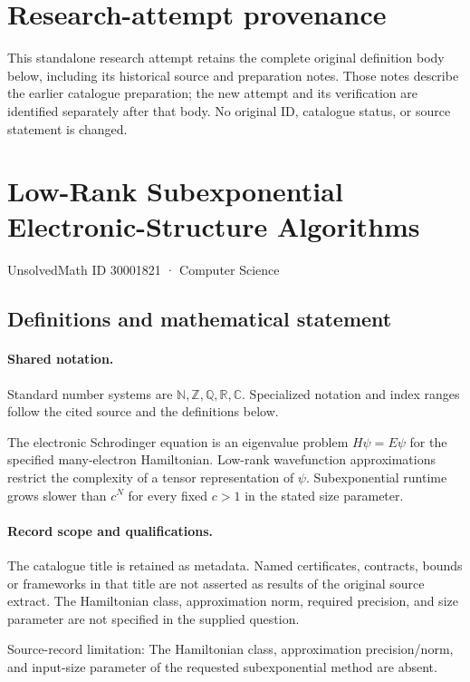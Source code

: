 \documentclass[11pt]{article}
\begin{document}
\section*{Research-attempt provenance}
This standalone research attempt retains the complete original definition body below,
including its historical source and preparation notes. Those notes describe the
earlier catalogue preparation; the new attempt and its verification are identified
separately after that body. No original ID, catalogue status, or source statement is changed.

\section{Low-Rank Subexponential Electronic-Structure Algorithms}\label{30001821}
{\small UnsolvedMath ID 30001821 · Computer Science}
\subsection{Definitions and mathematical statement}

\paragraph{Shared notation.}Standard number systems are $\mathbb N,\mathbb Z,\mathbb Q,\mathbb R,\mathbb C$. Specialized notation and index ranges follow the cited source and the definitions below.


The electronic Schrodinger equation is an eigenvalue problem $H\psi=E\psi$ for the specified many-electron Hamiltonian. Low-rank wavefunction approximations restrict the complexity of a tensor representation of $\psi$. Subexponential runtime grows slower than $c^N$ for every fixed $c>1$ in the stated size parameter.
\paragraph{Record scope and qualifications.}
The catalogue title is retained as metadata. Named certificates, contracts, bounds or frameworks in that title are not asserted as results of the original source extract.
The Hamiltonian class, approximation norm, required precision, and size parameter are not specified in the supplied question.

Source-record limitation: The Hamiltonian class, approximation precision/norm, and input-size parameter of the requested subexponential method are absent.
\end{document}
